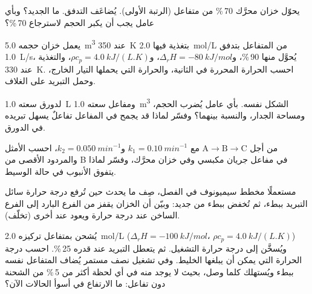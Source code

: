 \begin{exercise}[$\star\star$]\label{exo:b2:continuous-reactors:7}
يحوّل خزان محرَّك 70\,\% من متفاعل (الرتبة الأولى). يُضاعَف التدفق.
ما  الجديد؟ وبأي عامل يجب أن يكبر الحجم لاسترجاع
70\,\%؟
\end{exercise}

\begin{exercise}[$\star\star$]\label{exo:b2:continuous-reactors:8}
يعمل خزان حجمه \qty{5.0}{m^3} عند \qty{350}{K} بتغذية فيها
\qty{2.0}{mol/L} من المتفاعل بتدفق \qty{1.0}{L/s}، يُحوَّل منها 90\,\%، و$\Delta_r H
= \qty{-80}{kJ/mol}$، و$\rho c_p = \qty{4.0}{kJ/(L.K)}$، والتغذية عند \qty{330}{K}.
احسب الحرارة المحررة في الثانية، والحرارة التي يحملها التيار
الخارج، وحمل التبريد على الغلاف.
\end{exercise}

\begin{exercise}[$\star\star$]\label{exo:b2:continuous-reactors:9}
لدورق سعته \qty{1.0}{L} ومفاعل سعته \qty{1.0}{m^3} الشكل نفسه.
بأي عامل يُضرب الحجم، ومساحة الجدار، والنسبة بينهما؟ وفسّر لماذا قد
يجمح في المفاعل تفاعلٌ يسهل تبريده في الدورق.
\end{exercise}

\begin{exercise}[$\star\star\star$]\label{exo:b2:continuous-reactors:10}
من أجل $\mathrm A \to \mathrm B \to \mathrm C$ مع $k_1 = \qty{0.10}{min^{-1}}$
و$k_2 = \qty{0.050}{min^{-1}}$، احسب  الأمثل والمردود
الأقصى من B في مفاعل جريان مكبسي وفي خزان محرَّك، وفسّر
لماذا يتفوق الأنبوب في حالة الوسيط.
\end{exercise}

\begin{exercise}[$\star\star\star$]\label{exo:b2:continuous-reactors:11}
مستعملًا مخطط سيميونوف في الفصل، صِف ما يحدث حين تُرفع
درجة حرارة سائل التبريد ببطء، ثم تُخفض ببطء من جديد: وبيّن أن
الخزان يقفز من الفرع البارد إلى الفرع الساخن عند درجة حرارة ويعود عند
أخرى (تخلّف).
\end{exercise}

\begin{exercise}[$\star\star\star$]\label{exo:b2:continuous-reactors:12}
يُشحن  بمتفاعل تركيزه \qty{2.0}{mol/L} ($\Delta_r H =
\qty{-100}{kJ/mol}$، $\rho c_p = \qty{4.0}{kJ/(L.K)}$) ويُسخَّن إلى
درجة حرارة التشغيل. ثم يتعطل التبريد عند  قدره 25\,\%. احسب
درجة الحرارة التي يمكن أن يبلغها الخليط. وفي تشغيل نصف مستمر يُضاف
المتفاعل نفسه ببطء ويُستهلك كلما وصل، بحيث لا يوجد منه في أي لحظة أكثر من 5\,\%
من الشحنة دون تفاعل: ما الارتفاع في أسوأ الحالات الآن؟
\end{exercise}

